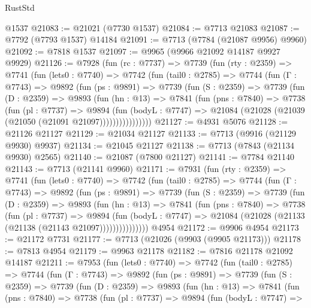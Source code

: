 \begin{lexlean}{RustStd}
\begin{coremodule}
    @1537
@21083 := @21021 (@7730 @1537)
@21084 := @7713 @21083
@21087 := @7792 (@7793 @1537) @14184
@21091 := @7713 (@7784 (@21087 @9956) @9960)
@21092 := @7818 @1537
@21097 := @9965 (@9966 @21092 @14187 @9927 @9929)
@21126 := @7928
    (fun (rc : @7737) =>
    @7739
      (fun (rty : @2359) =>
      @7741
        (fun (lets0 : @7740) =>
        @7742
          (fun (tail0 : @2785) =>
          @7744
            (fun (Γ : @7743) =>
            @9892
              (fun (ps : @9891) =>
              @7739
                (fun (S : @2359) =>
                @7739
                  (fun (D : @2359) =>
                  @9893
                    (fun (hn : @13) =>
                    @7841
                      (fun (pns : @7840) =>
                      @7738
                        (fun (pl : @7737) =>
                        @9894
                          (fun (bodyL : @7747) =>
                          @21084 (@21028 (@21039 (@21050 (@21091 @21097))))))))))))))))
@21127 := @4931 @5076
@21128 := @21126 @21127
@21129 := @21034 @21127
@21133 := @7713 (@9916 (@21129 @9930) @9937)
@21134 := @21045 @21127
@21138 := @7713 (@7843 (@21134 @9930) @2565)
@21140 := @21087 (@7800 @21127)
@21141 := @7784 @21140
@21143 := @7713 (@21141 @9960)
@21171 := @7931
    (fun (rty : @2359) =>
    @7741
      (fun (lets0 : @7740) =>
      @7742
        (fun (tail0 : @2785) =>
        @7744
          (fun (Γ : @7743) =>
          @9892
            (fun (ps : @9891) =>
            @7739
              (fun (S : @2359) =>
              @7739
                (fun (D : @2359) =>
                @9893
                  (fun (hn : @13) =>
                  @7841
                    (fun (pns : @7840) =>
                    @7738
                      (fun (pl : @7737) =>
                      @9894
                        (fun (bodyL : @7747) =>
                        @21084 (@21028 (@21133 (@21138 (@21143 @21097)))))))))))))))
    @4954
@21172 := @9906 @4954
@21173 := @21172 @7731
@21177 := @7713 (@21026 (@9903 (@9905 @21173)))
@21178 := @7813 @4954
@21179 := @9963 @21178
@21182 := @7816 @21178 @21092 @14187
@21211 := @7953
    (fun (lets0 : @7740) =>
    @7742
      (fun (tail0 : @2785) =>
      @7744
        (fun (Γ : @7743) =>
        @9892
          (fun (ps : @9891) =>
          @7739
            (fun (S : @2359) =>
            @7739
              (fun (D : @2359) =>
              @9893
                (fun (hn : @13) =>
                @7841
                  (fun (pns : @7840) =>
                  @7738
                    (fun (pl : @7737) =>
                    @9894
                      (fun (bodyL : @7747) =>

\end{coremodule}
\end{lexlean}
